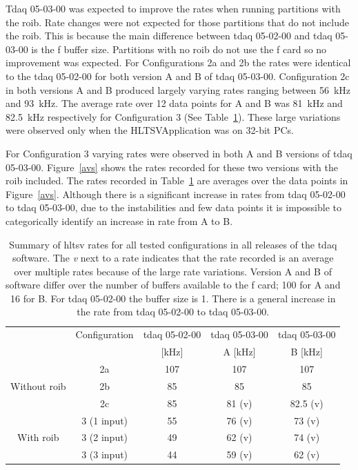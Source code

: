 \par Tdaq 05-03-00 was expected to improve the rates when running partitions with 
the \acrshort{roib}. Rate changes were not expected for those partitions that do not 
include the \acrshort{roib}. This is because the main difference between tdaq 05-02-00 
and tdaq 05-03-00 is the \acrshort{f} buffer size. Partitions with no \acrshort{roib} do not 
use the \acrshort{f} card so no improvement was expected. For Configurations 2a and 2b the rates were 
identical to the tdaq 05-02-00 for both version A and B of tdaq 05-03-00. 
Configuration 2c in both versions A and B produced largely varying rates ranging between 
56\ kHz and 93\ kHz. The average rate over 12 data points for A and B was 81\ kHz and 
82.5\ kHz respectively for Configuration 3 (See Table~\ref{sumry}). These large 
variations were observed only when the HLTSVApplication was on 32-bit PCs.  
 
\par For Configuration 3 varying rates were observed in both A and B 
versions of tdaq 05-03-00. Figure~\ref{avs} shows the rates recorded for these two 
versions with the \acrshort{roib} included. The rates recorded in 
Table~\ref{sumry} are averages over the data points in Figure~\ref{avs}. Although 
there is a significant increase in rates from tdaq 05-02-00 to tdaq 05-03-00, due 
to the instabilities and few data points it is impossible to categorically identify an increase in rate from A to B.

\begin{table}[!h]
\begin{center}
\begin{tabular}{c|c|c|c|c}
& Configuration& tdaq 05-02-00 & tdaq 05-03-00 & tdaq 05-03-00 \\
&  & [kHz]         &  A [kHz]    & B [kHz] \\
\hline\hline
\multirow{3}{*}{Without \acrshort{roib}}& 2a & 107 & 107 & 107 \\ 
& 2b & 85 & 85  & 85 \\ 
& 2c & 85 & 81 (v) & 82.5 (v) \\ 
\hline
\multirow{3}{*}{With \acrshort{roib}} & 3 (1 input)   & 55 & 76 (v) & 73 (v) \\
& 3 (2 input)   & 49 & 62 (v) & 74 (v) \\ 
& 3 (3 input)   & 44 & 59 (v) & 62 (v)
\end{tabular}
\end{center}
\caption{Summary of \acrshort{hltsv} rates for all tested configurations in all 
releases of the tdaq software. The {\it v} next to a rate indicates that the rate 
recorded is an average over multiple rates because of the large rate variations. Version A 
and B of software differ over the number of buffers available to the \acrshort{f} card; 100 
for A and 16 for B. For tdaq 05-02-00 the buffer size is 1. There is a general increase in the 
rate from tdaq 05-02-00 to tdaq 05-03-00.}
\label{sumry}
\end{table}

